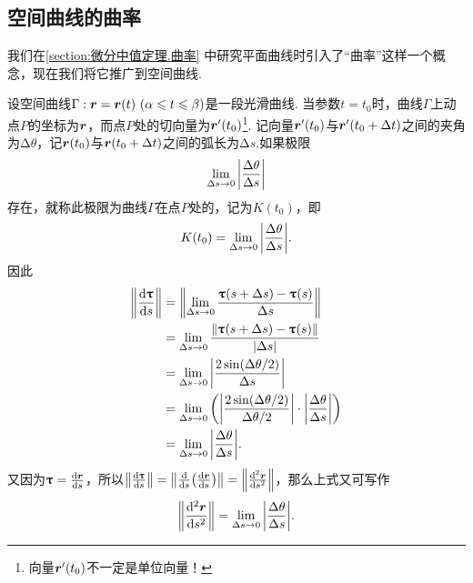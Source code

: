\subsection{空间曲线的曲率}
我们在\cref{section:微分中值定理.曲率} 中研究平面曲线时引入了“曲率”这样一个概念，现在我们将它推广到空间曲线.

设空间曲线\(\Gamma: \mat{r} = \mat{r}(t)\ (\alpha \leqslant t \leqslant \beta)\)是一段光滑曲线.
当参数\(t = t_0\)时，曲线\(\Gamma\)上动点\(P\)的坐标为\(\boldsymbol{r}\)，而点\(P\)处的切向量为\(\boldsymbol{r}'(t_0)\)\footnote{向量\(\boldsymbol{r}'(t_0)\)不一定是单位向量！}.
记向量\(\boldsymbol{r}'(t_0)\)与\(\boldsymbol{r}'(t_0+\Delta t)\)之间的夹角为\(\increment\theta\)，记\(\boldsymbol{r}(t_0)\)与\(\boldsymbol{r}(t_0+\Delta t)\)之间的弧长为\(\increment s\).如果极限\[
\lim\limits_{\Delta s \to 0} \abs{ \frac{\Delta\theta}{\Delta s} }
\]存在，就称此极限为曲线\(\Gamma\)在点\(P\)处的，记为\(K(t_0)\)，即\[
K(t_0) = \lim\limits_{\Delta s \to 0} \abs{ \frac{\Delta\theta}{\Delta s} }.
\]因此\begin{align*}
\norm{ \dv{\boldsymbol{\uptau}}{s} }
&= \norm{ \lim\limits_{\Delta s \to 0} \frac{\boldsymbol{\uptau}(s+\Delta s) - \boldsymbol{\uptau}(s)}{\Delta s} } \\
&= \lim\limits_{\Delta s \to 0} \frac{\norm{\boldsymbol{\uptau}(s+\Delta s) - \boldsymbol{\uptau}(s)}}{\abs{\Delta s}} \\
&= \lim\limits_{\Delta s \to 0} \abs{ \frac{2 \sin(\Delta\theta / 2)}{\Delta s} } \\
&= \lim\limits_{\Delta s \to 0} \left( \abs{ \frac{2 \sin(\Delta\theta / 2)}{\Delta\theta/2} } \cdot \abs{ \frac{\Delta\theta}{\Delta s} } \right) \\
&= \lim\limits_{\Delta s \to 0} \abs{ \frac{\Delta\theta}{\Delta s} }.
\end{align*}
又因为\(\boldsymbol{\uptau} = \dv{\boldsymbol{r}}{s}\)，所以\(\norm{ \dv{\boldsymbol{\uptau}}{s} } = \norm{ \dv{s}( \dv{\boldsymbol{r}}{s} ) } = \norm{ \dv[2]{\boldsymbol{r}}{s} }\)，那么上式又可写作\begin{equation}
\norm{ \dv[2]{\boldsymbol{r}}{s} }
= \lim\limits_{\Delta s \to 0} \abs{ \frac{\Delta\theta}{\Delta s} }.
\end{equation}

